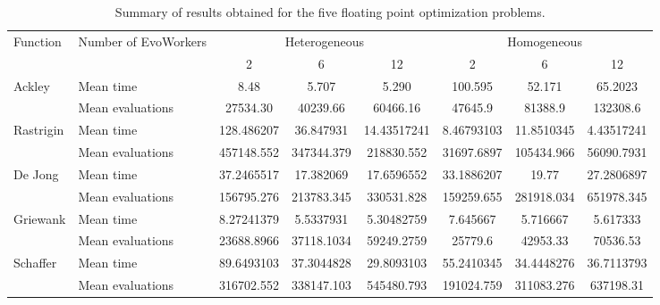 \documentclass[conference]{IEEEtran}
\begin{document}
\begin{table}[t]
  \centering
  \caption{Summary of results obtained for the five floating point
      optimization problems. }
    \label{fig:summary}
    \begin{tabular}{|l|l|c|c|c|c|c|c|}
      \hline 
      \multirow{2}{*}{Function} & \multirow{2}{*}{Number of EvoWorkers} &  \multicolumn{3}{|c|}{Heterogeneous} & \multicolumn{3}{|c|}{Homogeneous}\\
      \cline{3-8}
                                & & 2 & 6 & 12 & 2 & 6 & 12\\
            \hline 
      \multirow{2}{*}{Ackley} & Mean time & 8.48& 5.707& 5.290 & 100.595 & 52.171 & 65.2023\\
      \cline{2-8}
                                & Mean evaluations & 27534.30 & 40239.66 & 60466.16 & 47645.9 & 81388.9 & 132308.6 \\
      \hline 
      \multirow{2}{*}{Rastrigin} & Mean time &  128.486207 & 36.847931 & 14.43517241 & 8.46793103 & 11.8510345 &  4.43517241 \\
      \cline{2-8} 
                                & Mean evaluations & 457148.552 & 347344.379 & 218830.552 & 31697.6897 & 105434.966 & 56090.7931 \\
      \hline
      \multirow{2}{*}{De Jong} & Mean time & 37.2465517 & 17.382069 & 17.6596552 & 33.1886207 & 19.77 & 27.2806897 \\
      \cline{2-8}

                                & Mean evaluations & 156795.276 & 213783.345 & 330531.828 & 159259.655 & 281918.034 & 651978.345 \\
      \hline
      \multirow{2}{*}{Griewank} & Mean time & 8.27241379 & 5.5337931 & 5.30482759 & 7.645667 & 5.716667 & 5.617333 \\
      \cline{2-8}

                                & Mean evaluations & 23688.8966 & 37118.1034 & 59249.2759 & 25779.6 & 42953.33 & 70536.53 \\
            \hline

      \multirow{2}{*}{Schaffer} & Mean time &  89.6493103 & 37.3044828 & 29.8093103 & 55.2410345 & 34.4448276 & 36.7113793 \\
            \cline{2-8}
                                & Mean evaluations & 316702.552  & 338147.103 & 545480.793 & 191024.759 & 311083.276 & 637198.31 \\
            \hline

       \end{tabular}

\end{table}
\end{document}
